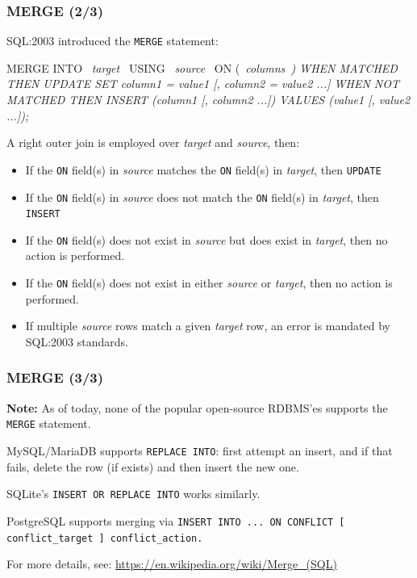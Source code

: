 \documentclass[english,serif,mathserif]{beamer}
\begin{document}
\begin{frame}[fragile]
  \frametitle{MERGE (2/3)}\footnotesize{}

  SQL:2003 introduced the \texttt{MERGE} statement:

   \begin{sql}
MERGE INTO ~\emph{target}~ USING ~\emph{source}~ ON (~\em columns~)
  WHEN MATCHED THEN
    UPDATE SET column1 = value1 [, column2 = value2 ...]
  WHEN NOT MATCHED THEN
    INSERT (column1 [, column2 ...])
      VALUES (value1 [, value2 ...]);
 \end{sql}

 \+
 A right outer join is employed over {\ttfamily\em target} and {\ttfamily\em
   source}, then:
 \begin{itemize}
 \item
    If the \texttt{ON} field(s) in {\ttfamily\em source} matches the \texttt{ON} field(s) in {\ttfamily\em target}, then
    \texttt{UPDATE}
  \item
    If the \texttt{ON} field(s) in {\ttfamily\em source} does not match the \texttt{ON} field(s) in
    {\ttfamily\em target}, then \texttt{INSERT}
  \item
    If the \texttt{ON} field(s) does not exist in {\ttfamily\em source}
    but does exist in {\ttfamily\em target}, then no action is performed.
  \item If the \texttt{ON} field(s) does not exist in either
    {\ttfamily\em source} or {\ttfamily\em target}, then no action is performed.
  \item If multiple {\ttfamily\em source} rows match a given {\ttfamily\em target} row,
    an error is mandated by SQL:2003 standards.
 \end{itemize}
\end{frame}


\begin{frame}[fragile]
  \frametitle{MERGE (3/3)}\footnotesize

  \+ \textbf{Note:} As of today, none of the popular open-source RDBMS'es
  supports the \texttt{MERGE} statement.

  \+
  MySQL/MariaDB supports \texttt{REPLACE INTO}: first attempt an insert, and if
  that fails, delete the row (if exists) and then insert the new one.

  \+
  SQLite's \texttt{INSERT OR REPLACE INTO} works similarly.

  \+
  PostgreSQL supports merging via \texttt{INSERT INTO ... ON CONFLICT [ conflict\_target ] conflict\_action.}

  \+
  \begin{references}
    For more details, see:
    \url{https://en.wikipedia.org/wiki/Merge_(SQL)}
  \end{references}
\end{frame}
\end{document}

